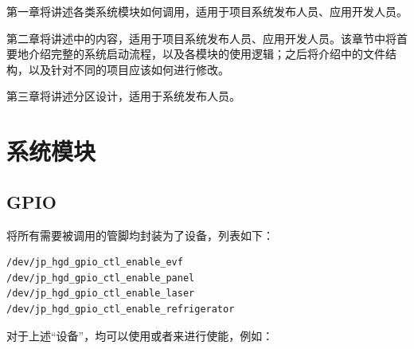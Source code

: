 \documentclass[UTF8]{ctexart}
\begin{document}
第一章将讲述各类系统模块如何调用，适用于项目系统发布人员、应用开发人员。

第二章将讲述中的内容，适用于项目系统发布人员、应用开发人员。该章节中将首要地介绍完整的系统启动流程，以及各模块的使用逻辑；之后将介绍中的文件结构，以及针对不同的项目应该如何进行修改。

第三章将讲述分区设计，适用于系统发布人员。

\newpage


\renewcommand{\contentsname}{目录}
\tableofcontents
\newpage




\section{系统模块}


\subsection{GPIO}

将所有需要被调用的管脚均封装为了设备，列表如下：

\begin{lstlisting}[language=sh]
/dev/jp_hgd_gpio_ctl_enable_evf
/dev/jp_hgd_gpio_ctl_enable_panel
/dev/jp_hgd_gpio_ctl_enable_laser
/dev/jp_hgd_gpio_ctl_enable_refrigerator
\end{lstlisting}

对于上述“设备”，均可以使用或者来进行使能，例如：
\end{document}
